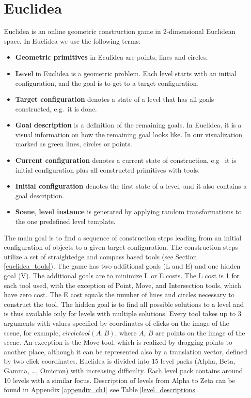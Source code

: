 \section{Euclidea}
\label{about_euclidea}
Euclidea is an online geometric construction game in 2-dimensional Euclidean space. In Euclidea we use the following terms:
\label{basic_concepts}
\begin{itemize}
    \item \textbf{Geometric primitives}  in Eculidea are points, lines and circles.
    \item \textbf{Level} in Euclidea is a geometric problem. Each level starts with an initial configuration, and the goal is to get to a target configuration.
    \item \textbf{Target configuration} denotes a state of a level that has all goals constructed, e.g.~it is done.
    \item \textbf{Goal description} is a definition of the remaining goals. In Euclidea, it is a visual information on how the remaining goal looks like. In our visualization marked as green lines, circles or points.
    \item \textbf{Current configuration} denotes a current state of construction, e.g~ it is initial configuration plus all constructed primitives with tools.
    \item \textbf{Initial configuration} denotes the first state of a level, and it also contains a goal description.
    \item \textbf{Scene}, \textbf{level instance} is generated by applying random transformations to the one predefined level template.
\end{itemize}
The main goal is to find a sequence of construction steps leading from an initial configuration of objects to a given target configuration. The construction steps utilize a set of straightedge and compass based tools (see Section \ref{euclidea_tools}). The game has two additional goals (L and E) and one hidden goal (V). The additional goals are to minimize L or E costs. The L cost is 1 for each tool used, with the exception of Point, Move, and Intersection tools, which have zero cost. The E cost equals the number of lines and circles necessary to construct the tool. The hidden goal is to find all possible solutions to a level and is thus available only for levels with multiple solutions.
\newline \newline
Every tool takes up to 3 arguments with values specified by coordinates of clicks on the image of the scene, for example, $circletool(A, B)$, where $A$, $B$ are points on the image of the scene. An exception is the Move tool, which is realized by dragging points to another place, although it can be represented also by a translation vector, defined by two click coordinates.
\newline \newline
Euclidea is divided into 15 level packs (Alpha, Beta, Gamma, \dots, Omicron) with increasing difficulty. Each level pack contains around 10 levels with a similar focus. Description of levels from Alpha to Zeta can be found in Appendix \ref{appendix_ch1} see Table \ref{level_descriptions}.
